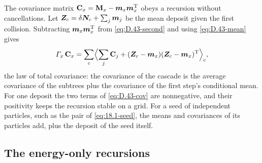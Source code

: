 The covariance matrix $\mathbf{C}_x = \mathbf{M}_x - \bm{m}_x\bm{m}_x^{\mathrm{T}}$ obeys a recursion without cancellations. Let $\bm{Z}_c = \delta\bm{N}_c + \sum_j\bm{m}_j$ be the mean deposit given the first collision. Subtracting $\bm{m}_x\bm{m}_x^{\mathrm{T}}$ from \cref{eq:D.43-second} and using \cref{eq:D.43-mean} gives
\begin{equation}
  \varGamma_x\,\mathbf{C}_x = \sum_c\Bigl\langle\sum_j\mathbf{C}_j + (\bm{Z}_c - \bm{m}_x)(\bm{Z}_c - \bm{m}_x)^{\mathrm{T}}\Bigr\rangle_c ,
  \label{eq:D.43-cov}
\end{equation}
the law of total covariance: the covariance of the cascade is the average covariance of the subtrees plus the covariance of the first step's conditional mean. For one deposit the two terms of \cref{eq:D.43-cov} are nonnegative, and their positivity keeps the recursion stable on a grid. For a seed of independent particles, such as the pair of \cref{eq:18.1-seed}, the means and covariances of its particles add, plus the deposit of the seed itself.

\subsection{The energy-only recursions}

